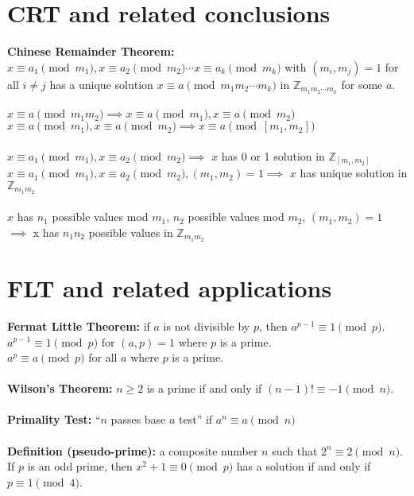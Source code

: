 \documentclass[12pt]{article}
\begin{document}
\section*{CRT and related conclusions}
\textbf{Chinese Remainder Theorem:} $x\equiv  a_1\pmod m_1, x\equiv  a_2\pmod m_2\cdots x\equiv  a_k\pmod m_k$ with $(m_i,m_j)= 1$ for all $i\neq j$ has a unique solution $x\equiv  a\pmod {m_1m_2\cdots m_k}$ in $\mathbb{Z}_{m_1m_2\cdots m_k}$ for some $a$.\\
\\
$x\equiv a \pmod {m_1m_2} \implies x\equiv a\pmod {m_1}, x\equiv a\pmod {m_2}$\\
$x\equiv a\pmod {m_1}, x\equiv a\pmod {m_2} \implies x\equiv a\pmod {[m_1,m_2]}$\\
\\
$x\equiv a_1\pmod {m_1}, x\equiv a_2\pmod {m_2} \implies$ $x$ has 0 or 1 solution in $\mathbb{Z}_{[m_1,m_2]}$\\
$x\equiv a_1\pmod {m_1}, x\equiv a_2\pmod {m_2}, (m_1,m_2)= 1 \implies$ $x$ has unique solution in $\mathbb{Z}_{m_1m_2}$\\
\\
$x$ has $n_1$ possible values mod $m_1$, $n_2$ possible values mod $m_2$, $(m_1, m_2)= 1$\\
$\implies$ x has $n_1n_2$ possible values in $\mathbb{Z}_{m_1m_2}$


\section*{FLT and related applications}
\textbf{Fermat Little Theorem:} if $a$ is not divisible by $p$, then $a^{p-1}\equiv 1\pmod p$.\\
$a^{p-1}\equiv 1\pmod p$ for $(a,p)= 1$ where $p$ is a prime.\\
$a^p\equiv a\pmod p$ for all $a$ where $p$ is a prime.\\
\\
\textbf{Wilson's Theorem:} $n\geq 2$ is a prime if and only if $(n-1)!\equiv  -1\pmod n$.\\
\\
\textbf{Primality Test:} “$n$ passes base $a$ test” if $a^n\equiv a\pmod n$\\
\\
\textbf{Definition (pseudo-prime):} a composite number $n$ such that $2^n\equiv  2\pmod n$.\\
If $p$ is an odd prime, then $x^2+1\equiv  0\pmod p$ has a solution if and only if $p\equiv  1\pmod 4$.
\end{document}
